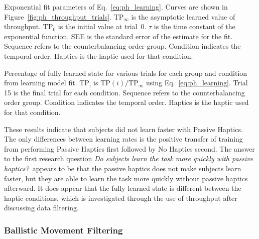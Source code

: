 \begin{table}
    \centering
    \caption{Exponential fit parameters of Eq.~\ref{eq:ph_learning}. Curves are shown in Figure~\ref{fig:ph_throughput_trials}. $\mathrm{TP}_{\infty}$ is the asymptotic learned value of throughput. $\mathrm{TP}_0$ is the initial value at trial~0. $\tau$ is the time constant of the exponential function. SEE is the standard error of the estimate for the fit. Sequence refers to the counterbalancing order group. Condition indicates the temporal order. Haptics is the haptic used for that condition.}
    \label{tab:ph_tp_regression}
\end{table}

\begin{table}
    \centering
    \caption{Percentage of fully learned state for various trials for each group and condition from learning model fit. $\mathrm{TP_i}$ is $\mathrm{TP}(i)/\mathrm{TP}_{\infty}$ using Eq.~\ref{eq:ph_learning}. Trial 15 is the final trial for each condition. Sequence refers to the counterbalancing order group. Condition indicates the temporal order. Haptics is the haptic used for that condition.}
    \label{tab:ph_tp_regression_values}
\end{table}

These results indicate that subjects did not learn faster with Passive Haptics.
The only differences between learning rates is the positive transfer of training from performing Passive Haptics first followed by No Haptics second.
The answer to the first research question \textit{Do subjects learn the task more quickly with passive haptics?}\ appears to be that the passive haptics does not make subjects learn faster, but they are able to learn the task more quickly without passive haptics afterward.
It does appear that the fully learned state is different between the haptic conditions, which is investigated through the use of throughput after discussing data filtering.

\subsubsection{Ballistic Movement Filtering}
\label{sec:ph_ballistic_filter}

